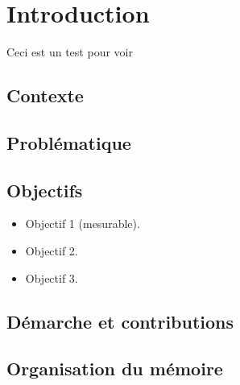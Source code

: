 \chapter{Introduction}
Ceci est un test pour voir 
\section{Contexte}

\section{Problématique}

\section{Objectifs}
\begin{itemize}
  \item Objectif 1 (mesurable).
  \item Objectif 2.
  \item Objectif 3.
\end{itemize}

\section{Démarche et contributions}

\section{Organisation du mémoire}


